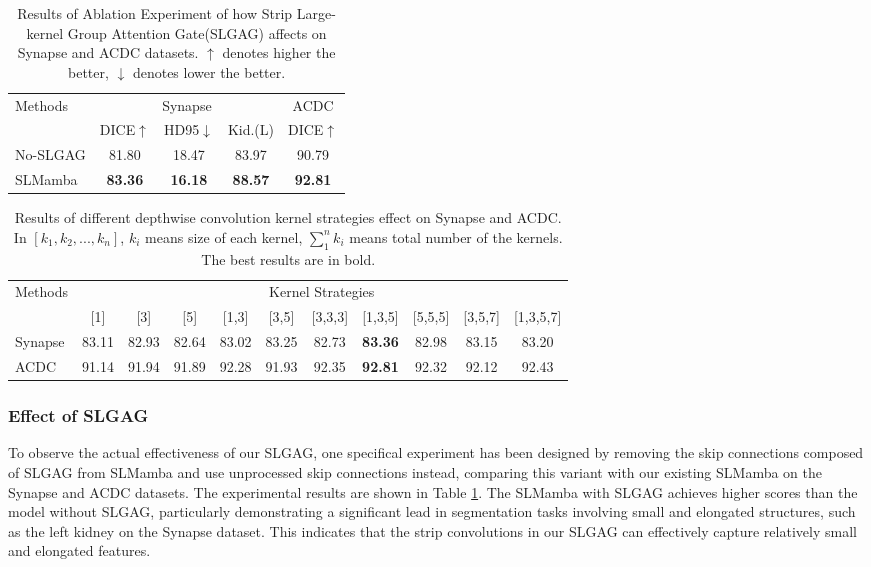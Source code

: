\documentclass[10pt, a4paper, twocolumn]{article}
\begin{document}
\begin{table}[h]
\footnotesize
\centering
\begin{tabular}{l|ccc|c}\hline
\multirow{2}{*}{Methods} & \multicolumn{3}{c|}{Synapse} & ACDC \\\cline{2-5}
& DICE$\uparrow$ & HD95$\downarrow$ &Kid.(L) & DICE$\uparrow$ \\\hline
No-SLGAG & 81.80 & 18.47 &83.97  & 90.79\\\hline
SLMamba & \textbf{83.36} & \textbf{16.18} &\textbf{88.57}  & \textbf{92.81} \\\hline
\end{tabular}
\caption{Results of Ablation Experiment of how Strip Large-kernel Group Attention Gate(SLGAG) affects on Synapse and ACDC datasets. $\uparrow$ denotes higher the better, $\downarrow$ denotes lower the better.}
\label{table4}
\end{table}

\begin{table}[h]
\small
\centering
\begin{tabular}{l|cccccccccc}\hline
\multirow{2}{*}{Methods} & \multicolumn{10}{c}{Kernel Strategies} \\\cline{2-11}
& [1] & [3] & [5] & [1,3] & [3,5] & [3,3,3] &[1,3,5]& [5,5,5] &[3,5,7] &[1,3,5,7]  \\\hline
Synapse& 83.11& 82.93& 82.64& 83.02& 83.25& 82.73 & \textbf{83.36}& 82.98& 83.15& 83.20 \\
ACDC & 91.14 &91.94 & 91.89 &92.28& 91.93& 92.35& \textbf{92.81}& 92.32& 92.12& 92.43\\
\hline
\end{tabular}
\caption{Results of different depthwise convolution kernel strategies effect on Synapse and ACDC. In $[k_{1},k_{2},...,k_{n}]$, $k_{i}$ means size of each kernel, $\sum_{1}^{n}k_{i}$ means total number of the kernels. The best results are in bold.}
\label{table5}
\end{table}


\subsubsection{Effect of SLGAG}

To observe the actual effectiveness of our SLGAG, one specifical experiment has been designed by removing the skip connections composed of SLGAG from SLMamba and use unprocessed skip connections instead, comparing this variant with our existing SLMamba on the Synapse and ACDC datasets. The experimental results are shown in Table \textcolor{red}{\ref{table4}}. The SLMamba with SLGAG achieves higher scores than the model without SLGAG, particularly demonstrating a significant lead in segmentation tasks involving small and elongated structures, such as the left kidney on the Synapse dataset. This indicates that the strip convolutions in our SLGAG can effectively capture relatively small and elongated features.
\end{document}
